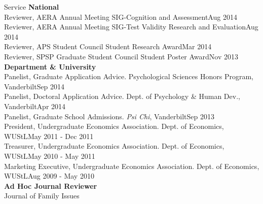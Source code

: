 \documentclass {resume}
\begin{document}
\begin{rSection}{\textrm{Service}}
{\large \textbf{National}}\\
Reviewer, AERA Annual Meeting SIG-Cognition and Assessment\hfill{Aug 2014}\smallskip\\
Reviewer, AERA Annual Meeting SIG-Test Validity Research and Evaluation\hfill{Aug 2014}\smallskip\\
Reviewer, APS Student Council Student Research Award\hfill{Mar 2014}\smallskip\\
Reviewer, SPSP Graduate Student Council Student Poster Award\hfill{Nov 2013}\medskip\\
{\large \textbf{Department \& University}}\\
Panelist, Graduate Application Advice. Psychological Sciences Honors Program, Vanderbilt\hfill {Sep 2014}\smallskip\\
Panelist, Doctoral Application Advice. Dept. of Psychology \& Human Dev., Vanderbilt\hfill {Apr 2014}\smallskip\\
Panelist, Graduate School Admissions. \textit{Psi Chi}, Vanderbilt\hfill {Sep 2013}\smallskip\\
President, Undergraduate Economics Association. Dept. of Economics, WUStL\hfill  {May 2011 - Dec 2011}\smallskip\\
Treasurer, Undergraduate Economics Association. Dept. of Economics, WUStL\hfill{May 2010 - May 2011}\smallskip\\
Marketing Executive, Undergraduate Economics Association. Dept. of Economics, WUStL\hfill  {Aug 2009 - May 2010}\medskip\\
{\large \textbf{Ad Hoc Journal Reviewer}}\\
Journal of Family Issues%

\end{rSection}
\end{document}
